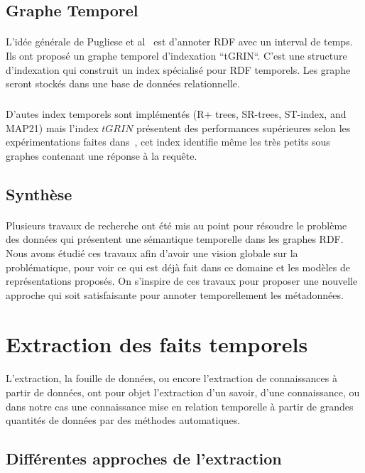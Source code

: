 \documentclass[12pt,a4]{report}
\begin{document}
\subsection{Graphe Temporel}
\paragraph{}
L'idée générale de Pugliese et al~\cite{pugliese2008} est d'annoter RDF avec un interval de temps.
Ils ont proposé un graphe temporel d'indexation ``tGRIN``. C'est une structure d’indexation qui construit un index spécialisé pour RDF temporels. Les graphe seront stockés dans une base de données relationnelle.
\subparagraph{}
D'autes index temporels sont implémentés (R+ trees, SR-trees, ST-index, and MAP21) mais l'index $tGRIN$ présentent des performances supérieures selon les expérimentations faites dans~\cite{pugliese2008}, cet index identifie même les très petits sous graphes contenant une réponse à la requête.
\subsection{Synthèse}
\paragraph{}
Plusieurs travaux de recherche ont été mis au point pour résoudre le problème des données qui présentent une sémantique temporelle dans les graphes RDF. Nous avons étudié ces travaux afin d'avoir une vision globale sur la problématique, pour voir ce qui est déjà fait dans ce domaine et les modèles de représentations proposés. On s'inspire de ces travaux pour proposer une nouvelle approche qui soit satisfaisante pour annoter temporellement les métadonnées.
\newpage
\section{Extraction des faits temporels}
\paragraph{}
L'extraction, la fouille de données, ou encore l'extraction de connaissances à partir de données, ont pour objet l'extraction d'un savoir, d'une connaissance, ou dans notre cas une connaissance mise en relation temporelle à partir de grandes quantités de données par des méthodes automatiques.
\subsection{Différentes approches de l'extraction }
\end{document}
